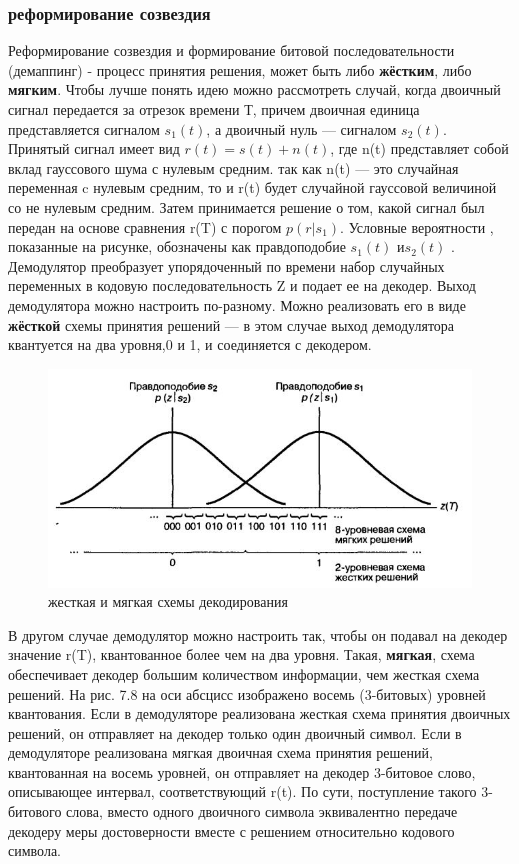 \subsubsection {реформирование созвездия} 
Реформирование созвездия и формирование битовой последовательности (демаппинг)  - процесс принятия решения, может быть либо {\bf жёстким}, либо {\bf мягким}. 
Чтобы лучше понять идею можно рассмотреть случай, когда двоичный сигнал передается за отрезок времени Т, причем двоичная единица представляется сигналом $s_1(t) $, а двоичный нуль — сигналом $s_2(t) $. 
Принятый сигнал имеет вид $r(t) = s(t)+n(t) $, где n(t) представляет собой вклад гауссового шума с нулевым средним. так как n(t) — это случайная переменная c нулевым средним, то и r(t) будет случайной гауссовой величиной со не нулевым средним. Затем принимается решение о том, какой сигнал был передан на основе сравнения r(T) с порогом $p(r|s_1)$. Условные вероятности , показанные на рисунке, обозначены как правдоподобие  $s_1(t) $ и$s_2(t) $ . Демодулятор преобразует упорядоченный по времени набор случайных переменных  в кодовую последовательность Z и подает ее на декодер. Выход демодулятора можно настроить по-разному. Можно реализовать его в виде {\bf жёсткой} схемы принятия решений --- в этом случае выход демодулятора квантуется на два уровня,0 и 1, и соединяется с декодером.
\begin{figure}[h]

\includegraphics{decision}
\caption{жесткая и мягкая схемы декодирования}
\end{figure}
В другом случае демодулятор можно настроить так, чтобы он подавал на декодер значение r(T), квантованное более чем на два уровня. Такая, {\bf мягкая}, схема обеспечивает декодер большим количеством информации, чем жесткая схема решений. На рис. 7.8 на оси абсцисс изображено восемь (3-битовых) уровней квантования. Если в демодуляторе реализована жесткая схема принятия двоичных решений, он отправляет на декодер только один двоичный символ. Если в демодуляторе реализована мягкая двоичная схема принятия решений, квантованная на восемь уровней, он отправляет на декодер 3-битовое слово, описывающее интервал, соответствующий r(t). По сути, поступление такого 3-битового слова, вместо одного двоичного символа эквивалентно передаче декодеру меры достоверности вместе с решением относительно кодового символа.

